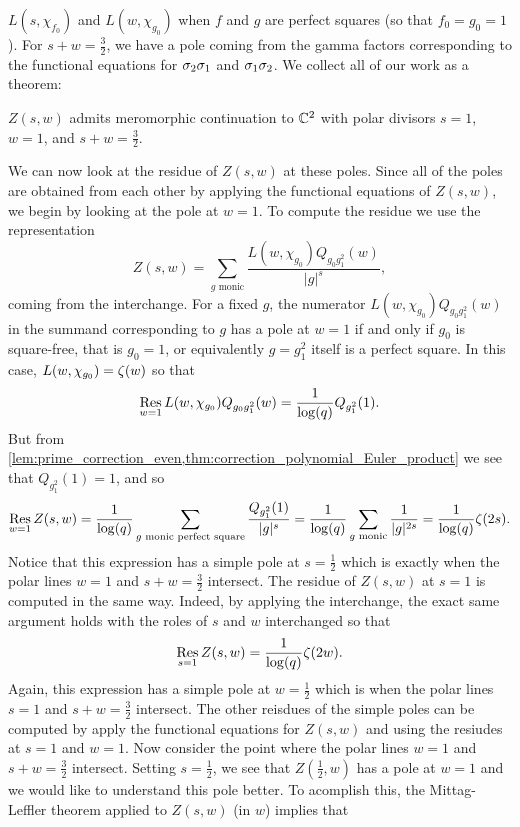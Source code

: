 \documentclass[12pt,reqno,oneside]{amsart}
\begin{document}
$L(s,\chi_{f_{0}})$ and $L(w,\chi_{g_{0}})$ when $f$ and $g$ are perfect squares (so that $f_{0} = g_{0} = 1$). For $s+w = \frac{3}{2}$, we have a pole coming from the gamma factors corresponding to the functional equations for $\sigma_{2}\sigma_{1}$ and $\sigma_{1}\sigma_{2}$. We collect all of our work as a theorem:

    \begin{theorem}
        $Z(s,w)$ admits meromorphic continuation to $\mathbb{C}^{2}$ with polar divisors $s = 1$, $w = 1$, and $s+w = \frac{3}{2}$.
    \end{theorem}

    We can now look at the residue of $Z(s,w)$ at these poles. Since all of the poles are obtained from each other by applying the functional equations of $Z(s,w)$, we begin by looking at the pole at $w = 1$. To compute the residue we use the representation
    \[
        Z(s,w) = \sum_{\text{$g$ monic}}\frac{L(w,\chi_{g_{0}})Q_{g_{0}g_{1}^{2}}(w)}{|g|^{s}},
    \]
    coming from the interchange. For a fixed $g$, the numerator $L(w,\chi_{g_{0}})Q_{g_{0}g_{1}^{2}}(w)$ in the summand corresponding to $g$ has a pole at $w = 1$ if and only if $g_{0}$ is square-free, that is $g_{0} = 1$, or equivalently $g = g_{1}^{2}$ itself is a perfect square. In this case, $L(w,\chi_{g_{0}}) = \zeta(w)$ so that
    \[
        \operatorname*{\mathrm{Res}}_{w = 1}L(w,\chi_{g_{0}})Q_{g_{0}g_{1}^{2}}(w) = \frac{1}{\log(q)}Q_{g_{1}^{2}}(1).
    \]
    But from \cref{lem:prime_correction_even,thm:correction_polynomial_Euler_product} we see that $Q_{g_{1}^{2}}(1) = 1$, and so
    \[
        \operatorname*{\mathrm{Res}}_{w = 1}Z(s,w) = \frac{1}{\log(q)}\sum_{\text{$g$ monic perfect square}}\frac{Q_{g_{1}^{2}}(1)}{|g|^{s}} = \frac{1}{\log(q)}\sum_{\text{$g$ monic}}\frac{1}{|g|^{2s}} = \frac{1}{\log(q)}\zeta(2s).
    \]
    Notice that this expression has a simple pole at $s = \frac{1}{2}$ which is exactly when the polar lines $w = 1$ and $s+w = \frac{3}{2}$ intersect. The residue of $Z(s,w)$ at $s = 1$ is computed in the same way. Indeed, by applying the interchange, the exact same argument holds with the roles of $s$ and $w$ interchanged so that
    \[
        \operatorname*{\mathrm{Res}}_{s = 1}Z(s,w) = \frac{1}{\log(q)}\zeta(2w).
    \]
    Again, this expression has a simple pole at $w = \frac{1}{2}$ which is when the polar lines $s = 1$ and $s+w = \frac{3}{2}$ intersect. The other reisdues of the simple poles can be computed by apply the functional equations for $Z(s,w)$ and using the resiudes at $s = 1$ and $w = 1$. Now consider the point where the polar lines $w = 1$ and $s+w = \frac{3}{2}$ intersect. Setting $s = \frac{1}{2}$, we see that $Z\left(\frac{1}{2},w\right)$ has a pole at $w= 1$ and we would like to understand this pole better. To acomplish this, the Mittag-Leffler theorem applied to $Z(s,w)$ (in $w$) implies that
\end{document}
